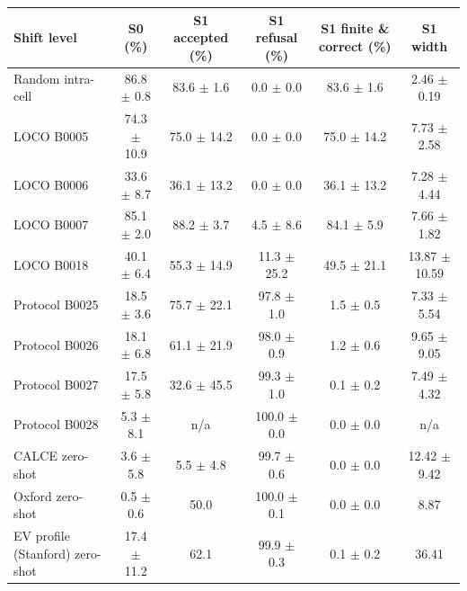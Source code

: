 \begin{tabular}{lccccc}
\toprule
Shift level & S0 (\%) & S1 accepted (\%) & S1 refusal (\%) & S1 finite \& correct (\%) & S1 width \\
\midrule
Random intra-cell & 86.8 $\pm$ 0.8 & 83.6 $\pm$ 1.6 & 0.0 $\pm$ 0.0 & 83.6 $\pm$ 1.6 & 2.46 $\pm$ 0.19 \\
LOCO B0005 & 74.3 $\pm$ 10.9 & 75.0 $\pm$ 14.2 & 0.0 $\pm$ 0.0 & 75.0 $\pm$ 14.2 & 7.73 $\pm$ 2.58 \\
LOCO B0006 & 33.6 $\pm$ 8.7 & 36.1 $\pm$ 13.2 & 0.0 $\pm$ 0.0 & 36.1 $\pm$ 13.2 & 7.28 $\pm$ 4.44 \\
LOCO B0007 & 85.1 $\pm$ 2.0 & 88.2 $\pm$ 3.7 & 4.5 $\pm$ 8.6 & 84.1 $\pm$ 5.9 & 7.66 $\pm$ 1.82 \\
LOCO B0018 & 40.1 $\pm$ 6.4 & 55.3 $\pm$ 14.9 & 11.3 $\pm$ 25.2 & 49.5 $\pm$ 21.1 & 13.87 $\pm$ 10.59 \\
Protocol B0025 & 18.5 $\pm$ 3.6 & 75.7 $\pm$ 22.1 & 97.8 $\pm$ 1.0 & 1.5 $\pm$ 0.5 & 7.33 $\pm$ 5.54 \\
Protocol B0026 & 18.1 $\pm$ 6.8 & 61.1 $\pm$ 21.9 & 98.0 $\pm$ 0.9 & 1.2 $\pm$ 0.6 & 9.65 $\pm$ 9.05 \\
Protocol B0027 & 17.5 $\pm$ 5.8 & 32.6 $\pm$ 45.5 & 99.3 $\pm$ 1.0 & 0.1 $\pm$ 0.2 & 7.49 $\pm$ 4.32 \\
Protocol B0028 & 5.3 $\pm$ 8.1 & n/a & 100.0 $\pm$ 0.0 & 0.0 $\pm$ 0.0 & n/a \\
CALCE zero-shot & 3.6 $\pm$ 5.8 & 5.5 $\pm$ 4.8 & 99.7 $\pm$ 0.6 & 0.0 $\pm$ 0.0 & 12.42 $\pm$ 9.42 \\
Oxford zero-shot & 0.5 $\pm$ 0.6 & 50.0 & 100.0 $\pm$ 0.1 & 0.0 $\pm$ 0.0 & 8.87 \\
EV profile (Stanford) zero-shot & 17.4 $\pm$ 11.2 & 62.1 & 99.9 $\pm$ 0.3 & 0.1 $\pm$ 0.2 & 36.41 \\
\bottomrule
\end{tabular}
